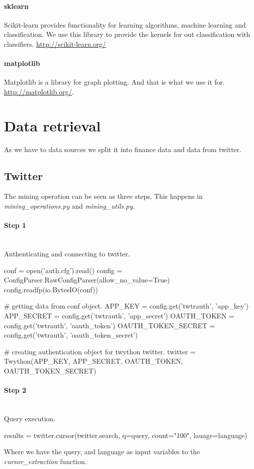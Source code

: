 \paragraph{sklearn}
Scikit-learn provides functionality for learning algorithms, machine learning
and classification. We use this library to provide the kernels for out
classification with classifiers. \url{http://scikit-learn.org/}

\paragraph{matplotlib}
Matplotlib is a library for graph plotting. And that is what we use it for.
\url{http://matplotlib.org/}.
 
\section{Data retrieval}\label{data:data_retrieval}
As we have to data sources we split it into finance data and data from twitter.

\subsection{Twitter}
The mining operation can be seen as three steps. This happens in
\textit{mining\_operations.py} and \textit{mining\_utils.py}.

\paragraph{Step 1}
\hspace{0pt}\\
Authenticating and connecting to twitter. 
\begin{python}
conf = open('auth.cfg').read()
config = ConfigParser.RawConfigParser(allow_no_value=True)
config.readfp(io.BytesIO(conf))

# getting data from conf object.
APP_KEY = config.get('twtrauth', 'app_key')
APP_SECRET = config.get('twtrauth', 'app_secret')
OAUTH_TOKEN = config.get('twtrauth', 'oauth_token')
OAUTH_TOKEN_SECRET = config.get('twtrauth', 
                                'oauth_token_secret')

# creating authentication object for twython twitter.
twitter = Twython(APP_KEY, 
                  APP_SECRET, 
                  OAUTH_TOKEN, 
                  OAUTH_TOKEN_SECRET)
\end{python}

\paragraph{Step 2}
\hspace{0pt}\\
Query execution.
\begin{python}
results = twitter.cursor(twitter.search, 
                         q=query, 
                         count="100", 
                         lauage=language)
\end{python}
Where we have the query, and language as input variables to the
\textit{cursor\_extraction} function. 

